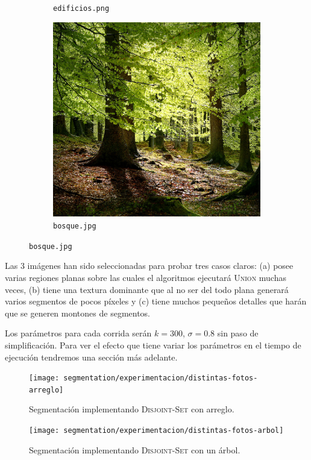 \begin{figure}[H]
\begin{subfigure}{0.3\linewidth}
		\caption{\texttt{edificios.png}}
	\end{subfigure}
	\begin{subfigure}{0.3\linewidth}
		\includegraphics[width=\linewidth]{segmentation/entradas-posta/bosque}
		\caption{\texttt{bosque.jpg}}
	\end{subfigure}
\end{figure}

Las 3 imágenes han sido seleccionadas para probar tres casos claros: (a)
posee varias regiones planas sobre las cuales el algoritmos ejecutará
\textsc{Union} muchas veces, (b) tiene una textura dominante que al no ser
del todo plana generará varios segmentos de pocos píxeles y (c) tiene muchos
pequeños detalles que harán que se generen montones de segmentos.

Los parámetros para cada corrida serán $k = 300$, $\sigma = 0.8$ sin paso de
simplificación. Para ver el efecto que tiene variar los parámetros en el tiempo
de ejecución tendremos una sección más adelante.

\begin{figure}[H]
	\centering
	\texttt{[image: segmentation/experimentacion/distintas-fotos-arreglo]}
	\caption{Segmentación implementando \textsc{Disjoint-Set} con arreglo.}
\end{figure}

\begin{figure}[H]
	\centering
	\texttt{[image: segmentation/experimentacion/distintas-fotos-arbol]}
	\caption{Segmentación implementando \textsc{Disjoint-Set} con un árbol.}
\end{figure}

